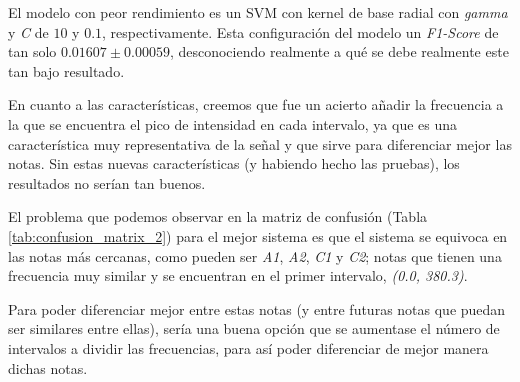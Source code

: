 \documentclass[12pt]{article}
\begin{document}
El modelo con peor rendimiento es un SVM con kernel de base radial con \textit{gamma} y \textit{C} de
$10$ y $0.1$, respectivamente. Esta configuración del modelo un \textit{F1-Score} de tan solo $0.01607 \pm 0.00059$, 
desconociendo realmente a qué se debe realmente este tan bajo resultado.

\bigskip
En cuanto a las características, creemos que fue un acierto añadir la frecuencia a la que se encuentra el pico de intensidad
en cada intervalo, ya que es una característica muy representativa de la señal y que sirve para diferenciar mejor las notas.
Sin estas nuevas características (y habiendo hecho las pruebas), los resultados no serían tan buenos.

\bigskip
El problema que podemos observar en la matriz de confusión (Tabla \ref{tab:confusion_matrix_2}) para el mejor sistema es que el sistema se equivoca
en las notas más cercanas, como pueden ser \textit{A1}, \textit{A2}, \textit{C1} y \textit{C2}; notas que tienen una frecuencia muy similar y se encuentran
en el primer intervalo, \textit{(0.0, 380.3)}. 

\bigskip
Para poder diferenciar mejor entre estas notas (y entre futuras notas
que puedan ser similares entre ellas), sería una buena opción que se aumentase el número de intervalos a dividir
las frecuencias, para así poder diferenciar de mejor manera dichas notas.
\end{document}
